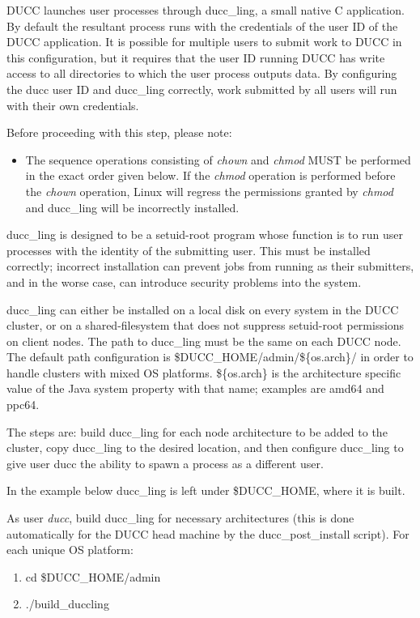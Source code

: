    DUCC launches user processes through ducc\_ling, a small native C application.
   By default the resultant process runs with the credentials of the user ID of
   the DUCC application. It is possible for multiple users to submit work to
   DUCC in this configuration, but it requires that the user ID running DUCC has
   write access to all directories to which the user process outputs data.
   By configuring the ducc user ID and ducc\_ling correctly, work submitted by
   all users will run with their own credentials.  

    Before proceeding with this step, please note: 
    \begin{itemize}
        \item The sequence operations consisting of {\em chown} and {\em chmod} MUST be performed
          in the exact order given below.  If the {\em chmod} operation is performed before
          the {\em chown} operation, Linux will regress the permissions granted by {\em chmod} 
          and ducc\_ling will be incorrectly installed.
    \end{itemize}

    ducc\_ling is designed to be a setuid-root program whose function is to run user processes with the identity of
    the submitting user. This must be installed correctly; incorrect installation can prevent jobs from running as
    their submitters, and in the worse case, can introduce security problems into the system.

    ducc\_ling can either be installed on a local disk on every system in the DUCC cluster, 
    or on a shared-filesystem that does not suppress setuid-root permissions on client nodes.
    The path to ducc\_ling must be the same on each DUCC node. 
    The default path configuration is
    \${DUCC\_HOME}/admin/\$\{os.arch\}/ in order to handle clusters with mixed OS platforms.
    \$\{os.arch\} is the architecture specific value of the Java system property with that name;
    examples are amd64 and ppc64.
   
	The steps are: build ducc\_ling for each node architecture to be added to the cluster,
	copy ducc\_ling to the desired location, and then configure ducc\_ling to give user
	ducc the ability to spawn a process as a different user.

    In the example below ducc\_ling is left under \$DUCC\_HOME, where it is built.

    As user {\em ducc}, build ducc\_ling for necessary architectures (this is done
    automatically for the DUCC head machine by the ducc\_post\_install script).
    For each unique OS platform:
    \begin{enumerate}
        \item cd \$DUCC\_HOME/admin
        \item ./build\_duccling
     \end{enumerate}


